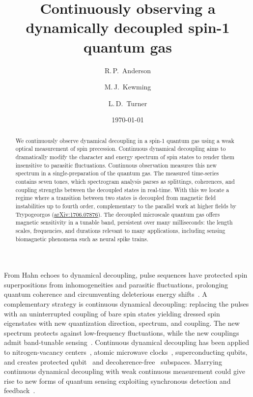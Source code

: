 \documentclass[aps,prl,reprint,superscriptaddress,floatfix]{revtex4-1}
\begin{document}
\title{Continuously observing a dynamically decoupled spin-1 quantum gas}

\author{R.\,P.~Anderson}
\author{M.\,J.~Kewming}
\author{L.\,D.~Turner}

\date{\today}

\begin{abstract}
We continuously observe dynamical decoupling in a spin-1 quantum gas using a weak optical measurement of spin precession.
Continuous dynamical decoupling aims to dramatically modify the character and energy spectrum of spin states to render them insensitive to parasitic fluctuations. 
Continuous observation measures this new spectrum in a single-preparation of the quantum gas.
The measured time-series contains seven tones, which spectrogram analysis parses as splittings, coherences, and coupling strengths between the decoupled states in real-time.
With this we locate a regime where a transition between two states is decoupled from magnetic field instabilities up to fourth order, complementary to the parallel work at higher fields by Trypogeorgos \etal (\href{https://arxiv.org/abs/1706.07876}{arXiv:1706.07876}).
The decoupled microscale quantum gas offers magnetic sensitivity in a tunable band, persistent over many milliseconds: the length scales, frequencies, and durations relevant to many applications, including sensing biomagnetic phenomena such as neural spike trains.
\end{abstract}

\maketitle

From Hahn echoes to dynamical decoupling, pulse sequences have protected spin superpositions from inhomogeneities and parasitic fluctuations, prolonging quantum coherence and circumventing deleterious energy shifts~\cite{biercuk_optimized_2009,lange_universal_2010,bluhm_dephasing_2011}.
A complementary strategy is continuous dynamical decoupling: replacing the pulses with an uninterrupted coupling of bare spin states yielding dressed spin eigenstates with new quantization direction, spectrum, and coupling.
The new spectrum protects against low-frequency fluctuations, while the new couplings admit band-tunable sensing~\cite{fanchini_continuously_2007}.
Continuous dynamical decoupling has been applied to nitrogen-vacancy centers~\cite{hirose_continuous_2012,loretz_radio-frequency_2013,cai_robust_2012,*cai_long-lived_2012,golter_protecting_2014}, atomic microwave clocks~\cite{kazakov_magic_2015,sarkany_controlling_2014}, superconducting qubits, and creates protected qubit~\cite{aharon_general_2013,baumgart_ultrasensitive_2016} and decoherence-free~\cite{facchi_quantum_2002,*facchi_unification_2004} subspaces.
Marrying continuous dynamical decoupling with weak continuous measurement could give rise to new forms of quantum sensing exploiting synchronous detection and feedback~\cite{vijay_stabilizing_2012}.
\end{document}
